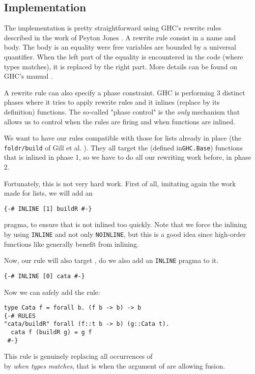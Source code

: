\subsection{Implementation}
The implementation is pretty straightforward using GHC's rewrite rules described in the work of Peyton Jones \cite{pbr}. A rewrite rule consist in a name and body. The body is an equality were free variables are bounded by a universal quantifier. When the left part of the equality is encountered in the code (where types matches), it is replaced by the right part. More details can be found on GHC's manual \cite{ghc:manual}.

A rewrite rule can also specify a phase constraint. GHC is performing 3 distinct phases where it tries to apply rewrite rules and it inlines (replace by its definition) functions. The so-called "phase control" is the \emph{only} mechanism that allows us to control when the rules are firing and when functions are inlined.

We want to have our rules compatible with those for lists already in place (the \verb|foldr/build| of Gill et al. \cite{Gill:1993:SCD:165180.165214}). They all target the  (defined in\verb|GHC.Base|) functions that is inlined in phase 1, so we have to do all our rewriting work before, in phase 2.

Fortunately, this is not very hard work. First of all, imitating again the work made for lists, we will add an
\begin{verbatim}
{-# INLINE [1] buildR #-}
\end{verbatim}
pragma, to ensure that  is not inlined too quickly. Note that we force the inlining by using \verb|INLINE| and not only \verb|NOINLINE|, but this is a good idea since high-order functions like  generally benefit from inlining.

Now, our rule will also target , do we also add an \verb|INLINE| pragma to it.
\begin{verbatim}
{-# INLINE [0] cata #-}
\end{verbatim}

Now we can safely add the rule:
\begin{verbatim}
type Cata f = forall b. (f b -> b) -> b
{-# RULES
"cata/buildR" forall (f::t b -> b) (g::Cata t).
  cata f (buildR g) = g f
 #-}
\end{verbatim}
This rule is genuinely replacing all occurrences of\\  by  \emph{when types matches}, that is when the argument of  are allowing fusion.

